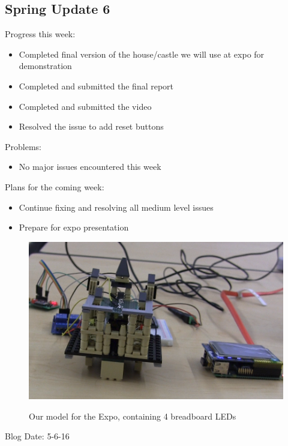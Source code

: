 \subsection{Spring Update 6}
Progress this week:
\begin{itemize}
   \item Completed final version of the house/castle we will use at expo for demonstration
   \item Completed and submitted the final report
   \item Completed and submitted the video
   \item Resolved the issue to add reset buttons
\end{itemize}
Problems:
\begin{itemize}
   \item No major issues encountered this week
\end{itemize}
Plans for the coming week:
\begin{itemize}
   \item Continue fixing and resolving all medium level issues
   \item Prepare for expo presentation
\end{itemize}
\begin{figure}[h!]
   \includegraphics[scale=0.5]{castle}\\
   \caption{Our model for the Expo, containing 4 breadboard LEDs}
\end{figure}
Blog Date: 5-6-16

